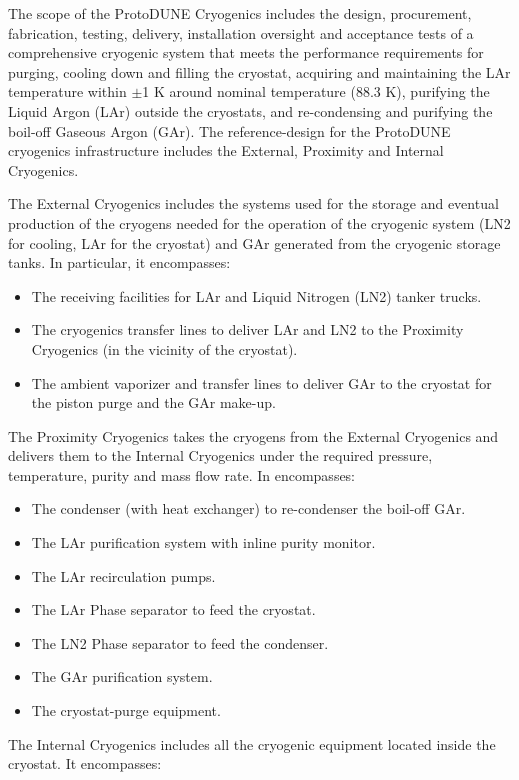 The scope of the ProtoDUNE Cryogenics includes the design, procurement, fabrication, testing, delivery, installation oversight and acceptance tests of a comprehensive cryogenic system that meets the performance requirements for purging, cooling down and filling the cryostat, acquiring and maintaining the LAr temperature within $\pm$1 K around nominal temperature (88.3 K), purifying the Liquid Argon (LAr) outside the cryostats, and re-condensing and purifying the boil-off Gaseous Argon (GAr).
The reference-design for the ProtoDUNE cryogenics infrastructure includes the External, Proximity and Internal Cryogenics.

The External Cryogenics includes the systems used for the storage and eventual production of the cryogens needed for the operation of the cryogenic system (LN2 for cooling, LAr for the cryostat) and GAr generated from the cryogenic storage tanks. In particular, it encompasses:

\begin{itemize}
\item The receiving facilities for LAr and Liquid Nitrogen (LN2) tanker trucks.
\item The cryogenics transfer lines to deliver LAr and LN2 to the Proximity Cryogenics (in the vicinity of the cryostat).
\item The ambient vaporizer and transfer lines to deliver GAr to the cryostat for the piston purge and the GAr make-up.
\end{itemize}

The Proximity Cryogenics takes the cryogens from the External Cryogenics and delivers them to the Internal Cryogenics under the required pressure, temperature, purity and mass flow rate. In encompasses:

\begin{itemize}
\item The condenser (with heat exchanger) to re-condenser the boil-off GAr.
\item The LAr purification system with inline purity monitor.
\item The LAr recirculation pumps.
\item The LAr Phase separator to feed the cryostat.
\item The LN2 Phase separator to feed the condenser.
\item The GAr purification system.
\item The cryostat-purge equipment.
\end{itemize}

The Internal Cryogenics includes all the cryogenic equipment located inside the cryostat. It encompasses:

